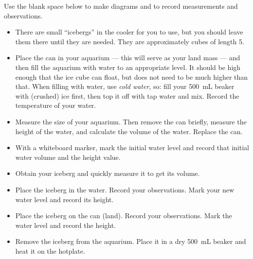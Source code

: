  Use the blank space below to make diagrams and to record measurements and observations.
	\begin{itemize}
	\item There are small ``icebergs'' in the cooler for you to use, but you should leave them there until they are needed. They are approximately cubes of length \unit{5}{\centi\meter}.
	\item Place the can in your aquarium --- this will serve as your land mass ---  and then fill the aquarium with water to an appropriate level.  It should be high enough that the ice cube can float, but does not need to be much higher than that.  When filling with water, use {\em cold water}, so: fill your 500~mL beaker with (crushed) ice first, then top it off with tap water and mix.  Record the temperature of your water.
	\item Measure the size of your aquarium. Then remove the can briefly, measure the height of the water, and calculate the volume of the water.  Replace the can.
	\item With a whiteboard marker, mark the initial water level and record that initial water volume and the height value.
	\item Obtain your iceberg and quickly measure it to get its volume.
	\item Place the iceberg in the water. Record your observations. Mark your new water level and record its height.
	\item Place the iceberg on the can (land). Record your observations.  Mark the water level and record the height.
	\item Remove the iceberg from the aquarium. Place it in a dry 500~mL beaker and heat it on the hotplate.
	\end{itemize}
	
\vspace{10cm}

